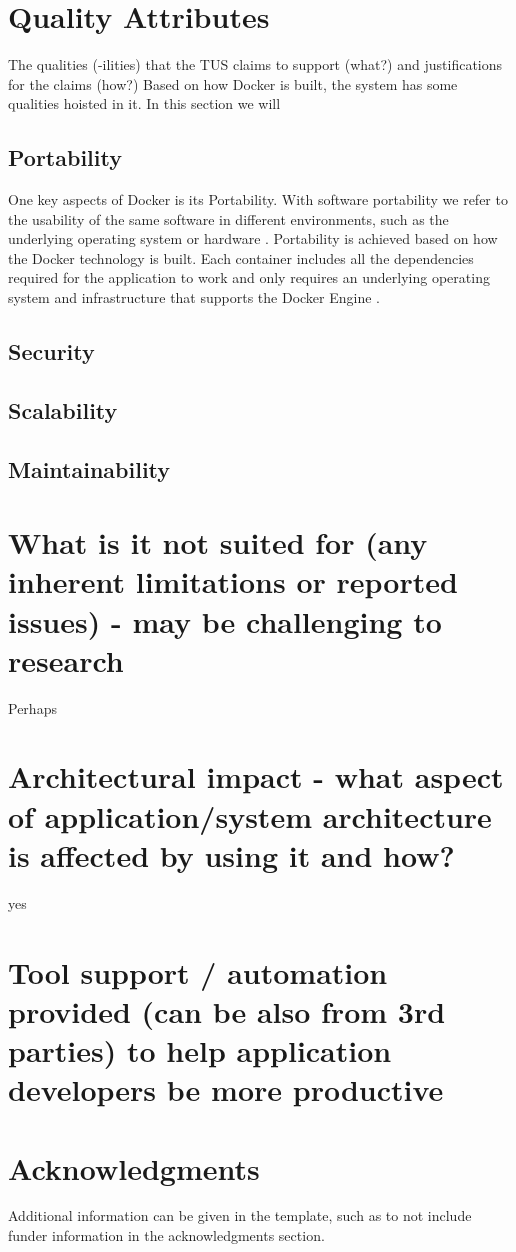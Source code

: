 \documentclass[fleqn,12pt]{olplainarticle}
\begin{document}
\section*{ Quality Attributes}

The qualities (-ilities) that the TUS claims to support (what?) and justifications for the claims (how?)
Based on how Docker is built, the system has some qualities hoisted in it. In this section we will 

\subsection*{Portability}
One key aspects of Docker is its Portability. With software portability we refer to the usability of the same software in different environments, such as the underlying operating system or hardware \citep{wiki:Software_portability}. Portability is achieved based on how the Docker technology is built. Each container includes all the dependencies required for the application to work and only requires an underlying operating system and infrastructure that supports the Docker Engine \citep{hy:DevOps_with_Docker}.
\subsection*{Security}
\subsection*{Scalability}
\subsection*{Maintainability}


\section*{What is it not suited for (any inherent limitations or reported issues) - may be challenging to research}

Perhaps

\section*{Architectural impact - what aspect of application/system architecture is affected by using it and how?}
yes
\section*{Tool support / automation provided (can be also from 3rd parties) to help application developers be more productive}

\section*{Acknowledgments}

Additional information can be given in the template, such as to not include funder information in the acknowledgments section.


\end{document}
